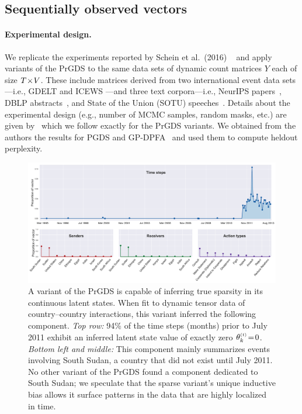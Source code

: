 \documentclass{article}
\begin{document}
\subsection{Sequentially observed vectors}
\paragraph{Experimental design.} We replicate the experiments reported by Schein et al.~(2016)
~\cite{schein2016poisson} and apply variants of the PrGDS to the same data sets of dynamic count matrices $Y$ each of size $T \!\times\! V$. These include matrices derived from two international event data sets---i.e., GDELT \cite{leetaru2013gdelt} and ICEWS \cite{boscheeicews}---and three text corpora---i.e., NeurIPS papers~\cite{neuripscorpus}, DBLP abstracts~\cite{dblp}, and State of the Union (SOTU) speeches~\cite{sotu}. Details about the experimental design (e.g., number of MCMC samples, random masks, etc.) are given by~\cite{schein2016poisson} which we follow exactly for the PrGDS variants. We obtained from the authors the results for PGDS and GP-DPFA~\cite{acharya2015nonparametric} and used them to compute heldout perplexity.~


\begin{figure}[t]
\centering
\includegraphics[width=0.9\linewidth]{../../fig/components/icews/zero-ordering/new_plots/eps0-component-0.pdf}
\caption{\footnotesize \label{fig:sudan} A variant of the PrGDS is capable of inferring true sparsity in its continuous latent states. When fit to dynamic tensor data of country--country interactions, this variant inferred the following component. \emph{Top row:} 94\% of the time steps (months) prior to July 2011 exhibit an inferred latent state value of exactly zero $\thetakt \teq 0$. \emph{Bottom left and middle:} This component mainly summarizes events involving South Sudan, a country that did not exist until July 2011. No other variant of the PrGDS found a component dedicated to South Sudan; we speculate that the sparse variant's unique inductive bias allows it surface patterns in the data that are highly localized in time.~}
\end{figure}
\end{document}
